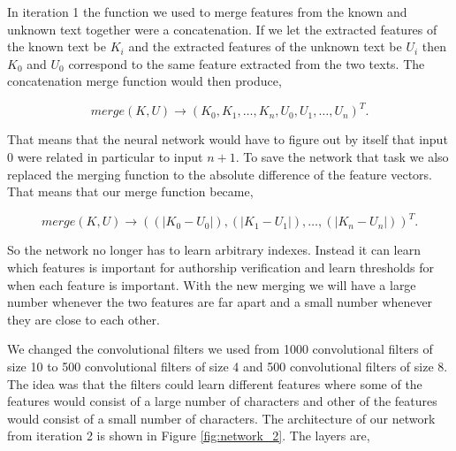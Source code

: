 In iteration 1 the function we used to merge features from the known and unknown
text together were a concatenation. If we let the extracted features of the
known text be $K_i$ and the extracted features of the unknown text be $U_i$ then
$K_0$ and $U_0$ correspond to the same feature extracted from the two texts. The
concatenation merge function would then produce,

\begin{equation}
    merge(K, U) \rightarrow \left(
        K_0, K_1, \dots, K_n, U_0, U_1, \dots, U_n
    \right)^T.
\end{equation}

That means that the neural network would have to figure out by itself that input
$0$ were related in particular to input $n + 1$. To save the network that task
we also replaced the merging function to the absolute difference of the feature
vectors. That means that our merge function became,

\begin{equation}
    merge(K, U) \rightarrow \left(
        (|K_0 - U_0|), (|K_1 - U_1|), \dots, (|K_n - U_n|)
    \right)^T.
\end{equation}

So the network no longer has to learn arbitrary indexes. Instead it can learn
which features is important for authorship verification and learn thresholds for
when each feature is important. With the new merging we will have a large number
whenever the two features are far apart and a small number whenever they are
close to each other.

We changed the convolutional filters we used from 1000 convolutional filters of
size 10 to 500 convolutional filters of size 4 and 500 convolutional filters of
size 8. The idea was that the filters could learn different features where some
of the features would consist of a large number of characters and other of the
features would consist of a small number of characters. The architecture of our
network from iteration 2 is shown in Figure \ref{fig:network_2}. The layers are,

